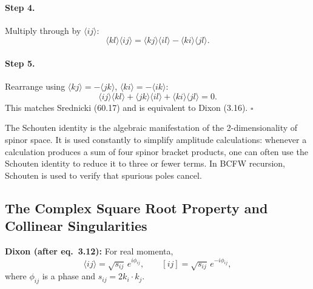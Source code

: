 \paragraph{Step 4.} Multiply through by $\langle ij\rangle$:
\begin{equation}
  \langle kl\rangle\langle ij\rangle = \langle kj\rangle\langle il\rangle - \langle ki\rangle\langle jl\rangle.
\end{equation}

\paragraph{Step 5.} Rearrange using $\langle kj\rangle=-\langle jk\rangle$, $\langle ki\rangle=-\langle ik\rangle$:
\begin{equation}
  \boxed{\langle ij\rangle\langle kl\rangle + \langle jk\rangle\langle il\rangle + \langle ki\rangle\langle jl\rangle = 0.}
\end{equation}
This matches Srednicki (60.17) and is equivalent to Dixon (3.16). $\square$

\begin{remark}
The Schouten identity is the algebraic manifestation of the 2-dimensionality of spinor space.
It is used constantly to simplify amplitude calculations:
whenever a calculation produces a sum of four spinor bracket products, one can often
use the Schouten identity to reduce it to three or fewer terms.
In BCFW recursion, Schouten is used to verify that spurious poles cancel.
\end{remark}

\subsection{The Complex Square Root Property and Collinear Singularities}

\textbf{Dixon (after eq.~3.12):} For real momenta,
\begin{equation}
  \langle ij\rangle = \sqrt{s_{ij}}\,e^{i\phi_{ij}}, \qquad
  [ij] = \sqrt{s_{ij}}\,e^{-i\phi_{ij}},
  \tag{Dixon after 3.12}
\end{equation}
where $\phi_{ij}$ is a phase and $s_{ij}=2k_i\cdot k_j$.

